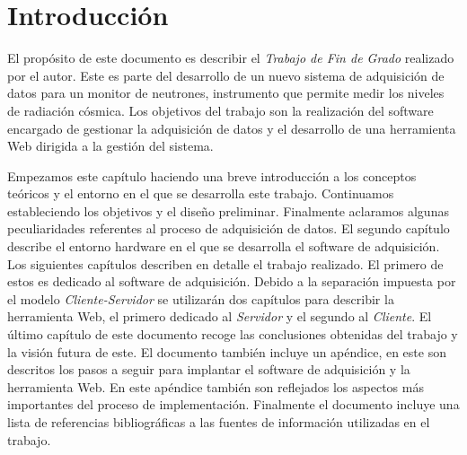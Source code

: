 \chapter{Introducción}
\label{cap1}

El propósito de este documento es describir el \emph{Trabajo de Fin de Grado} realizado por el autor. Este es parte del desarrollo de un nuevo sistema de
adquisición de datos para un monitor de neutrones, instrumento que permite medir los niveles de radiación cósmica. Los objetivos del trabajo son la
realización del software encargado de gestionar la adquisición de datos y el desarrollo de una herramienta Web dirigida a la gestión del sistema.	
\par
Empezamos este capítulo haciendo una breve introducción a los conceptos teóricos y el entorno en el que se desarrolla este trabajo. Continuamos
estableciendo los objetivos y el diseño preliminar. Finalmente aclaramos algunas peculiaridades referentes al proceso de adquisición de datos. El
segundo capítulo describe el entorno hardware en el que se desarrolla el software de adquisición. Los siguientes capítulos describen en detalle el
trabajo realizado. El primero de estos es dedicado al software de adquisición. Debido a la separación impuesta por el modelo \emph{Cliente-Servidor}
se utilizarán dos capítulos para describir la herramienta Web, el primero dedicado al \emph{Servidor} y el segundo al \emph{Cliente}. El último
capítulo de este documento recoge las conclusiones obtenidas del trabajo y la visión futura de este. El documento también incluye un apéndice, en este
son descritos los pasos a seguir para implantar el software de adquisición y la herramienta Web. En este apéndice también son reflejados los aspectos
más importantes del proceso de implementación. Finalmente el documento incluye una lista de referencias bibliográficas a las fuentes de información
utilizadas en el trabajo. 

